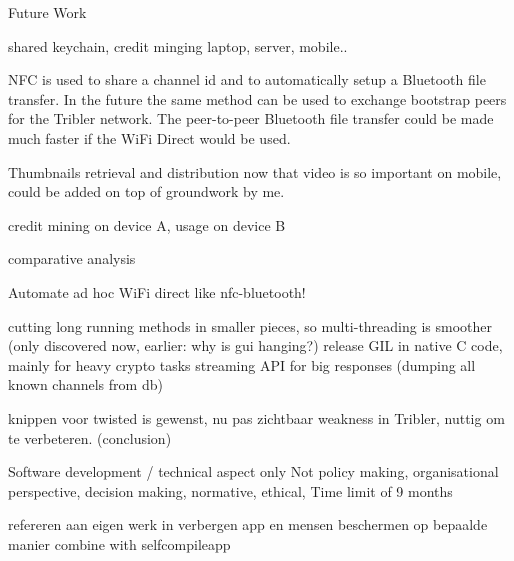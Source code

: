 Future Work

shared keychain, credit minging laptop, server, mobile..


NFC is used to share a channel id and to automatically setup a Bluetooth file transfer.
In the future the same method can be used to exchange bootstrap peers for the Tribler network.
The peer-to-peer Bluetooth file transfer could be made much faster if the WiFi Direct would be used.


Thumbnails retrieval and distribution now that video is so important on mobile, could be added on top of groundwork by me.


credit mining on device A, usage on device B


comparative analysis

Automate ad hoc WiFi direct like nfc-bluetooth!

cutting long running methods in smaller pieces, so multi-threading is smoother (only discovered now, earlier: why is gui hanging?)
release GIL in native C code, mainly for heavy crypto tasks
streaming API for big responses (dumping all known channels from db)

knippen voor twisted is gewenst, nu pas zichtbaar weakness in Tribler, nuttig om te verbeteren. (conclusion)


Software development / technical aspect only
Not policy making, organisational perspective, decision making, normative, ethical,
Time limit of 9 months


refereren aan eigen werk in verbergen app en mensen beschermen op bepaalde manier
combine with selfcompileapp
